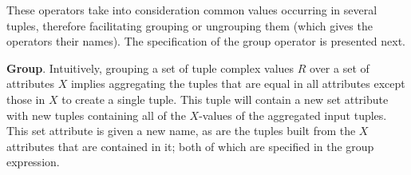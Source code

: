 These operators take into consideration common values occurring in several tuples, therefore facilitating grouping or ungrouping them (which gives the operators their names). The specification of the group operator is presented next.

\vspace*{0.25cm}
\noindent \textbf{Group}. Intuitively, grouping a set of tuple complex values $R$ over a set of attributes $X$ implies aggregating the tuples that are equal in all attributes except those in $X$ to create a single tuple. This tuple  will contain a new set attribute with new tuples containing all of the $X$-values of the aggregated input tuples. This set attribute is given a new name, as are the tuples built from the $X$ attributes that are contained in it; both of which are specified in the group expression.

